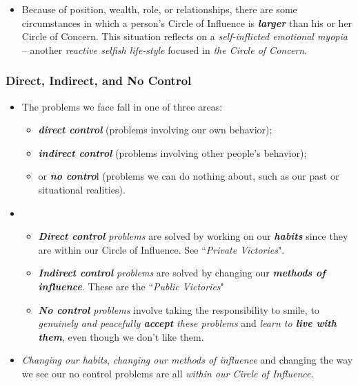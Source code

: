 \documentclass[11pt]{article}
\begin{document}
\begin{itemize}
\item Because of position, wealth, role, or relationships, there are some circumstances in which a person's Circle of Influence is \emph{\textbf{larger}} than his or her Circle of Concern. This situation reflects on a \emph{self-inflicted emotional myopia} -- another \emph{reactive selfish life-style} focused in \emph{the Circle of Concern}.
\end{itemize}
\subsubsection{Direct, Indirect, and No Control}
\begin{itemize}
\item The problems we face fall in one of three areas: 
\begin{itemize}
\item \emph{\textbf{direct control}} (problems involving our own behavior);
\item \emph{\textbf{indirect control}} (problems involving other people's behavior);
\item or \emph{\textbf{no contro}}l (problems we can do nothing about, such as our past or situational realities). 
\end{itemize}

\item \begin{itemize}
\item \emph{\textbf{Direct control} problems} are solved by working on our \textbf{\emph{habits}} since they are within our Circle of Influence. See ``\emph{Private Victories}".

\item \emph{\textbf{Indirect control} problems} are solved by changing our \emph{\textbf{methods of influence}}. These are the ``\emph{Public Victories}"

\item \emph{\textbf{No control} problems} involve taking the responsibility to smile, to \emph{genuinely and peacefully \textbf{accept} these problems} and \emph{learn to \textbf{live with them}}, even though we don't like them.
\end{itemize}

\item \emph{Changing our habits}, \emph{changing our methods of influence} and changing the way we see our no control problems are all \emph{within our Circle of Influence}.
\end{itemize}
\end{document}
